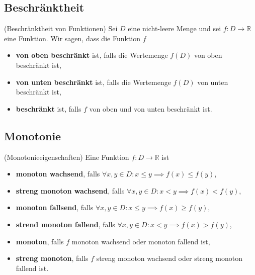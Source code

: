 \documentclass[../Analysis1_script.tex]{subfiles}
\begin{document}
\subsection{Beschränktheit}

\begin{definition}{(Beschränktheit von Funktionen)}
	Sei $D$ eine nicht-leere Menge und sei $f: D \to \mathbb {R}$ eine Funktion. Wir sagen, dass die Funktion $f$
	\begin{itemize}
		\item{\textbf{von oben beschränkt}} ist, falls die Wertemenge $f(D)$ von oben beschränkt ist, 
		\item{\textbf{von unten beschränkt}} ist, falls die Wertemenge $f(D)$ von unten beschränkt ist, 
		\item{\textbf{beschränkt}} ist, falls $f$ von oben und von unten beschränkt ist.
	\end{itemize}
\end{definition}

\subsection{Monotonie}

\begin{definition}{(Monotonieeigenschaften)}
	Eine Funktion $f: D \to \mathbb{R}$ ist
	\begin{itemize}
		\item{\textbf{monoton wachsend}}, falls $\forall x, y \in D: x \leq y \implies f(x) \leq f(y)$,
		\item{\textbf{streng monoton wachsend}}, falls $\forall x, y \in D: x < y \implies f(x) < f(y)$,
		\item{\textbf{monoton fallsend}}, falls $\forall x, y \in D: x \leq y \implies f(x) \geq f(y)$,
		\item{\textbf{strend monoton fallend}}, falls $\forall x, y \in D: x < y \implies f(x) > f(y)$,
		\item{\textbf{monoton}}, falls $f$ monoton wachsend oder monoton fallend ist,
		\item{\textbf{streng monoton}}, falls $f$ streng monoton wachsend oder streng monoton fallend ist.
	\end{itemize}
\end{definition}
\end{document}

